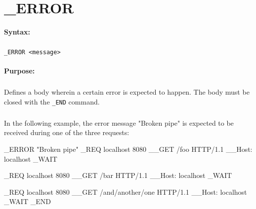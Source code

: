 
\newpage
\section{\_ERROR}
\label{cmd:_ERROR}

\paragraph{Syntax:}
\subparagraph{}
\texttt{\_ERROR <message>}

\paragraph{Purpose:}
\subparagraph{}
Defines a body wherein a certain error is expected to happen. 
The body must be closed with the \texttt{\_END} command.

\subparagraph{}
In the following example, the error message "Broken pipe" is 
expected to be received during one of the three requests: 

\begin{usplisting}
    _ERROR "Broken pipe"
    _REQ localhost 8080
    __GET /foo HTTP/1.1
    __Host: localhost
    _WAIT

    _REQ localhost 8080
    __GET /bar HTTP/1.1
    __Host: localhost
    _WAIT

    _REQ localhost 8080
    __GET /and/another/one HTTP/1.1
    __Host: localhost
    _WAIT
    _END
\end{usplisting}
